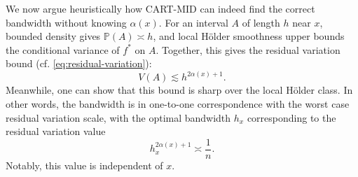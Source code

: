 \documentclass[11pt]{article}
\theoremstyle{plain}
\theoremstyle{definition}
\theoremstyle{remark}
\theoremstyle{plain}
\renewcommand{\P}{\mathbb{P}}
\newcommand{\Var}{\textnormal{Var}}
\newcommand{\1}{\mathbbm{1}}
\begin{document}
We now argue heuristically how CART-MID can indeed find the correct bandwidth without knowing $\alpha(x)$.
For an interval $A$ of length $h$ near $x$, bounded density gives $\P(A)\asymp h$, and local H\"older smoothness upper bounds the conditional variance of $f^*$ on $A$. 
Together, this gives the residual variation bound (cf. \eqref{eq:residual-variation}):
\[
V(A)\lesssim h^{2\alpha(x)+1}.
\]
Meanwhile, one can show that this bound is sharp over the local H\"older class.
In other words, the bandwidth is in one-to-one correspondence with the worst case residual variation scale, with the optimal bandwidth $h_x$ corresponding to the residual variation value
\[
h_x^{2\alpha(x)+1} \asymp \frac{1}{n}.
\]
Notably, this value is independent of $x$.
\end{document}
